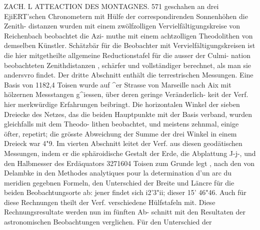 \documentclass[12pt,a4paper]{article}
\begin{document}
\newpage
ZACH. L ATTEACTION DES MONTAGNES. 571\newline
geschahen an drei EjiERT'schen Chronometern mit Hülfe der correspondirenden Sonnenhöhen \textbullet{} die Zenith-\newline
distanzen wurden mit einem zwölfzolligen Vervielfältigungskreise von Reichenbach beobachtet die Azi-\newline
muthe mit einem achtzolligen Theodolithen von demselben Künstler. Schätzbär für die Beobachter mit\newline
Vervielfältigungskreisen ist die hier mitgetheilte allgemeine Reductionstafel für die ausser der Culmi-\newline
nation beobachteten Zenithdistanzen , schärfer und vollständiger berechnet, als man sie andersvro findet.\newline
Der dritte Abschnitt enthält die terrestrischen Messungen. Eine Basis von 1182,4 Toisen wurde auf \^{}er\newline
Strasse von Marseille nach Aix mit hölzernen Messstangen g\^{}iessen, über deren geringe Veränderlich-\newline
keit der Verf. hier merkwürdige Erfahrungen beibringt. Die horizontalen Winkel der sieben Dreiecke\newline
des Netzes, das die beiden Hauptpunkte mit der Basis verband, wurden gleichfalls mit dem Theodo-\newline
lithen beobachtet, und meistens zehnmal, einige öfter, repetirt; die grösste Abweichung der Summe der\newline
drei Winkel in einem Dreieck war 4"9. Im vierten Abschnitt leitet der Verf. aus diesen geodätischen\newline
Messungen, indem er die sphäroidische Gestalt der Erde, die Abplattung \quotedblbase J-j-, und den Halbmesser des\newline
Erdäquators 3271604 Toisen zum Grunde legt , nach den von Delambke in den Methodes analytiques pour\newline
la determination d'un arc du meridien gegebnen Formeln, den Unterschied der Breite und Läncre für\newline
die beiden Beobachtungsorte ab: jener findet sich i2'3"ii; dieser 15' 46"46. Auch für diese Rechnungen\newline
theilt der Verf. verschiedene Hülfstafeln mit. Diese Rechnungsresultate werden nun im fünften Ab-\newline
schnitt mit den Resultaten der astronomischen Beobachtungen verglichen. Für den Unterschied der\newline
\end{document}
